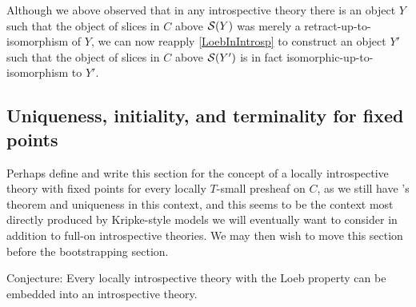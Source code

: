 \begin{observation}
Although we above observed that in any introspective theory there is an object $Y$ such that the object of slices in $C$ above $\mathcal{S}(Y)$ was merely a retract-up-to-isomorphism of $Y$, we can now reapply \cref{LoebInIntrosp} to construct an object $Y'$ such that the object of slices in $C$ above $\mathcal{S}(Y')$ is in fact isomorphic-up-to-isomorphism to $Y'$. 
\end{observation}

\subsection{Uniqueness, initiality, and terminality for fixed points}
\begin{TODOblock}
Perhaps define and write this section for the concept of a locally introspective theory with fixed points for every locally $T$-small presheaf on $C$, as we still have \Loeb's theorem and uniqueness in this context, and this seems to be the context most directly produced by Kripke-style models we will eventually want to consider in addition to full-on introspective theories. We may then wish to move this section before the bootstrapping section.

Conjecture: Every locally introspective theory with the Loeb property can be embedded into an introspective theory.
\end{TODOblock}


